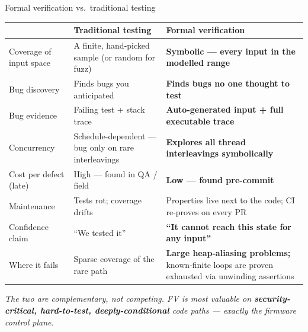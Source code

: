 \documentclass[aspectratio=169,11pt]{beamer}
\newcommand{\hil}[1]{\textbf{\textcolor{nvgreendark}{#1}}}
\begin{document}
\begin{frame}{Formal verification vs.\ traditional testing}
  \centering
  \renewcommand{\arraystretch}{1.05}
  \footnotesize
  \begin{tabular}{@{} p{} p{} p{} @{}}
    \toprule
    & \textbf{Traditional testing} & \textbf{Formal verification} \\
    \midrule
    Coverage of input space
      & A finite, hand-picked sample (or random for fuzz)
      & \hil{Symbolic — every input in the modelled range} \\
    Bug discovery
      & Finds bugs you anticipated
      & \hil{Finds bugs no one thought to test} \\
    Bug evidence
      & Failing test + stack trace
      & \hil{Auto-generated input + full executable trace} \\
    Concurrency
      & Schedule-dependent — bug only on rare interleavings
      & \hil{Explores all thread interleavings symbolically} \\
    Cost per defect (late)
      & High — found in QA / field
      & \hil{Low — found pre-commit} \\
    Maintenance
      & Tests rot; coverage drifts
      & Properties live next to the code; CI re-proves on every PR \\
    Confidence claim
      & ``We tested it''
      & \hil{``It cannot reach this state for any input''} \\
    Where it fails
      & Sparse coverage of the rare path
      & \hil{Large heap-aliasing problems;} known-finite loops are
        proven exhausted via unwinding assertions \\
    \bottomrule
  \end{tabular}

  \vspace{0.4em}
  \scriptsize
  \textit{The two are complementary, not competing. FV is most valuable on
  \hil{security-critical, hard-to-test, deeply-conditional} code paths —
  exactly the firmware control plane.}
\end{frame}
\end{document}
